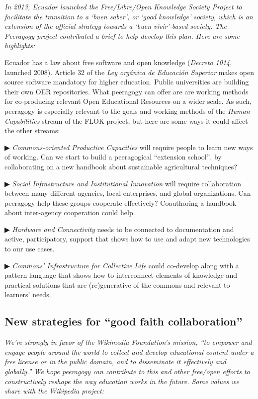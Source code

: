 \emph{In 2013, Ecuador launched the Free/Libre/Open Knowledge Society
Project to facilitate the transition to a `\emph{buen saber}', or `good
knowledge' society, which is an extension of the official strategy
towards a `\emph{buen vivir}'-based society. The Peeragogy project
contributed a brief to help develop this plan. Here are some
highlights:}

Ecuador has a law about free software and open knowledge (\emph{Decreto
1014}, launched 2008). Article 32 of the \emph{Ley orgánica de Educación
Superior} makes open source software mandatory for higher education.
Public universities are building their own OER repositories. What
peeragogy can offer are are working methods for co-producing relevant
Open Educational Resources on a wider scale. As such, peeragogy is
especially relevant to the goals and working methods of the \emph{Human
Capabilities} stream of the FLOK project, but here are some ways it
could affect the other streams:

▶ \emph{Commons-oriented Productive Capacities} will require people to
learn new ways of working. Can we start to build a peeragogical
``extension school'', by collaborating on a new handbook about
sustainable agricultural techniques?

▶ \emph{Social Infrastructure and Institutional Innovation} will require
collaboration between many different agencies, local enterprises, and
global organizations. Can peeragogy help these groups cooperate
effectively? Coauthoring a handbook about inter-agency cooperation could
help.

▶ \emph{Hardware and Connectivity} needs to be connected to
documentation and active, participatory, support that shows how to use
and adapt new technologies to our use cases.

▶ \emph{Commons' Infrastructure for Collective Life} could co-develop
along with a pattern language that shows how to interconnect elements of
knowledge and practical solutions that are (re)generative of the commons
and relevant to learners' needs.

\subsection{New strategies for ``good faith
collaboration''}\label{new-strategies-for-good-faith-collaboration}

\emph{We're strongly in favor of the Wikimedia Foundation's mission,
``to empower and engage people around the world to collect and develop
educational content under a free license or in the public domain, and to
disseminate it effectively and globally.'' We hope peeragogy can
contribute to this and other free/open efforts to constructively reshape
the way education works in the future. Some values we share with the
Wikipedia project:}

